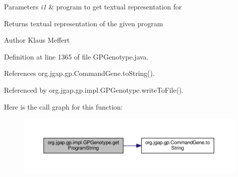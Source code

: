 \begin{DoxyParams}{Parameters}
{\em i1} & program to get textual representation for \\
\hline
\end{DoxyParams}
\begin{DoxyReturn}{Returns}
textual representation of the given program
\end{DoxyReturn}
\begin{DoxyAuthor}{Author}
Klaus Meffert 
\end{DoxyAuthor}


Definition at line 1365 of file G\-P\-Genotype.\-java.



References org.\-jgap.\-gp.\-Command\-Gene.\-to\-String().



Referenced by org.\-jgap.\-gp.\-impl.\-G\-P\-Genotype.\-write\-To\-File().



Here is the call graph for this function\-:
\nopagebreak
\begin{figure}[H]
\begin{center}
\leavevmode
\includegraphics[width=350pt]{classorg_1_1jgap_1_1gp_1_1impl_1_1_g_p_genotype_a356baf22df15fe6c0c88aadb45a80a5e_cgraph}
\end{center}
\end{figure}


